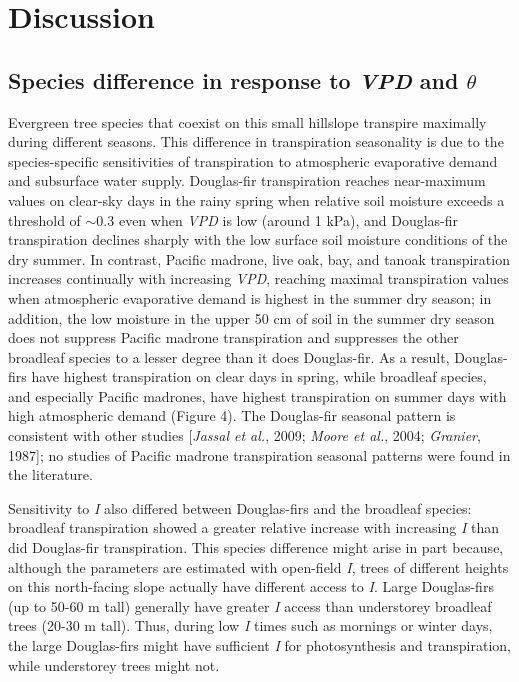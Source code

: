 \section{Discussion}

\subsection{Species difference in response to \textit{VPD} and $\theta$}
Evergreen tree species that coexist on this small hillslope transpire maximally during different seasons.  This difference in transpiration seasonality is due to the species-specific sensitivities of transpiration to atmospheric evaporative demand and subsurface water supply.  Douglas-fir transpiration reaches near-maximum values on clear-sky days in the rainy spring when relative soil moisture exceeds a threshold of $\sim$0.3 even when \textit{VPD} is low (around 1 kPa), and Douglas-fir transpiration declines sharply with the low surface soil moisture conditions of the dry summer.  In contrast, Pacific madrone, live oak, bay, and tanoak transpiration increases continually with increasing \textit{VPD}, reaching maximal transpiration values when atmospheric evaporative demand is highest in the summer dry season; in addition, the low moisture in the upper 50 cm of soil in the summer dry season does not suppress Pacific madrone transpiration and suppresses the other broadleaf species to a lesser degree than it does Douglas-fir.  As a result, Douglas-firs have highest transpiration on clear days in spring, while broadleaf species, and especially Pacific madrones, have highest transpiration on summer days with high atmospheric demand (Figure 4).  The Douglas-fir seasonal pattern is consistent with other studies [\textit{Jassal et al.}, 2009; \textit{Moore et al.}, 2004; \textit{Granier}, 1987]; no studies of Pacific madrone transpiration seasonal patterns were found in the literature.

Sensitivity to \textit{I} also differed between Douglas-firs and the broadleaf species: broadleaf transpiration showed a greater relative increase with increasing \textit{I} than did Douglas-fir transpiration. This species difference might arise in part because, although the parameters are estimated with open-field \textit{I}, trees of different heights on this north-facing slope actually have different access to \textit{I}. Large Douglas-firs (up to 50-60 m tall) generally have greater \textit{I} access than understorey broadleaf trees (20-30 m tall).  Thus, during low \textit{I} times such as mornings or winter days, the large Douglas-firs might have sufficient \textit{I} for photosynthesis and transpiration, while understorey trees might not.

